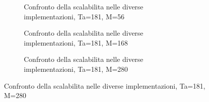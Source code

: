 \documentclass[a4paper]{article}
\begin{document}
\newpage
\begin{figure}[!h]
  \centering
  \begin{subfigure}[b]{.333\textheight}
    \centering
    \resizebox{\columnwidth}{!}{}
    \caption{Confronto della scalabilita nelle diverse implementazioni, Ta=181, M=56}
  \end{subfigure}
  \vfill
  \begin{subfigure}[b]{.333\textheight}
    \centering
    \resizebox{\columnwidth}{!}{}
    \caption{Confronto della scalabilita nelle diverse implementazioni, Ta=181, M=168}
  \end{subfigure}
  \vfill
  \begin{subfigure}[b]{.333\textheight}
    \centering
    \resizebox{\columnwidth}{!}{}
    \caption{Confronto della scalabilita nelle diverse implementazioni, Ta=181, M=280}
  \end{subfigure}
\end{figure}

\newpage
\FloatBarrier
\section{}
\end{document}
